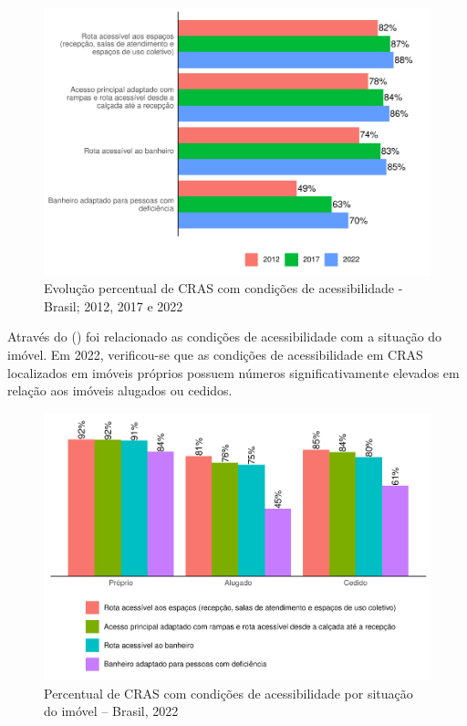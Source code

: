 \documentclass[
  brazilian]{report}
\begin{document}
\begin{figure}
\includegraphics{Censo-SUAS-2022_files/figure-latex/CRAS-acessibilidade-1} \caption[Evolução percentual de CRAS com condições de acessibilidade - Brasil]{Evolução percentual de CRAS com condições de acessibilidade - Brasil; 2012, 2017 e 2022}\label{fig:CRAS-acessibilidade}
\end{figure}

Através do () foi relacionado as
condições de acessibilidade com a situação do imóvel. Em 2022,
verificou-se que as condições de acessibilidade em CRAS localizados em
imóveis próprios possuem números significativamente elevados em relação
aos imóveis alugados ou cedidos.

\begin{figure}
\includegraphics{Censo-SUAS-2022_files/figure-latex/CRAS-acessibilidade-situacao-1} \caption[Percentual de CRAS com condições de acessibilidade por situação do imóvel – Brasil, 2022]{Percentual de CRAS com condições de acessibilidade por situação do imóvel – Brasil, 2022}\label{fig:CRAS-acessibilidade-situacao}
\end{figure}
\end{document}
